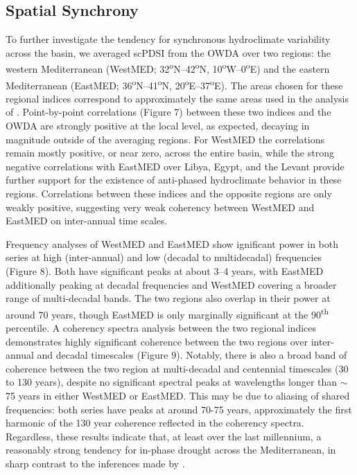 \documentclass[draft,jgr]{AGUTeX}
\begin{document}
\begin{article}
\subsection{Spatial Synchrony}
\noindent To further investigate the tendency for synchronous hydroclimate variability across the basin, we averaged scPDSI from the OWDA over two regions: the western Mediterranean (WestMED; 32\textsuperscript{o}N--42\textsuperscript{o}N, 10\textsuperscript{o}W--0\textsuperscript{o}E) and the eastern Mediterranean (EastMED; 36\textsuperscript{o}N--41\textsuperscript{o}N, 20\textsuperscript{o}E--37\textsuperscript{o}E). The areas chosen for these regional indices correspond to approximately the same areas used in the analysis of \cite{Roberts:etal2012}. Point-by-point correlations (Figure 7) between these two indices and the OWDA are strongly positive at the local level, as expected, decaying in magnitude outside of the averaging regions. For WestMED the correlations remain mostly positive, or near zero, across the entire basin, while the strong negative correlations with EastMED over Libya, Egypt, and the Levant provide further support for the existence of anti-phased hydroclimate behavior in these regions. Correlations between these indices and the opposite regions are only weakly positive, suggesting very weak coherency between WestMED and EastMED on inter-annual time scales.

\indent Frequency analyses of WestMED and EastMED show ignificant power in both series at high (inter-annual) and low (decadal to multidecadal) frequencies (Figure 8). Both have significant peaks at about 3--4 years, with EastMED additionally peaking at decadal frequencies and WestMED covering a broader range of multi-decadal bands. The two regions also overlap in their power at around 70 years, though EastMED is only marginally significant at the 90\textsuperscript{th} percentile. A coherency spectra analysis between the two regional indices demonstrates highly significant coherence between the two regions over inter-annual and decadal timescales (Figure 9). Notably, there is also a broad band of coherence between the two region at multi-decadal and centennial timescales (30 to 130 years), despite no significant spectral peaks at wavelengths longer than $\sim$75 years in either WestMED or EastMED. This may be due to aliasing of shared frequencies: both series have peaks at around 70-75 years, approximately the first harmonic of the 130 year coherence reflected in the coherency spectra. Regardless, these results indicate that, at least over the last millennium, a reasonably strong tendency for in-phase drought across the Mediterranean, in sharp contrast to the inferences made by \citet{Roberts:etal2012}.


\end{article}
\end{document}
